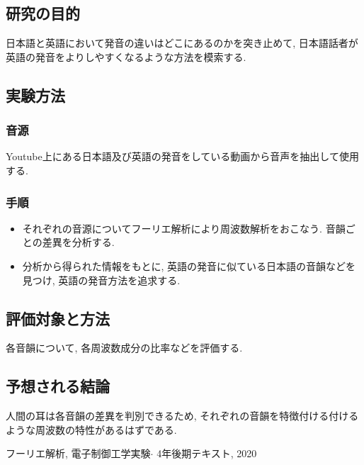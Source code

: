 \documentclass[titlepage]{jsarticle}
\begin{document}
    \subsection{研究の目的}
        日本語と英語において発音の違いはどこにあるのかを突き止めて,
        日本語話者が英語の発音をよりしやすくなるような方法を模索する.

    \subsection{実験方法}
        \subsubsection{音源}
            Youtube上にある日本語及び英語の発音をしている動画から音声を抽出して使用する.

        \subsubsection{手順}
            \begin{itemize}
                \item{
                    それぞれの音源についてフーリエ解析により周波数解析をおこなう.
                    音韻ごとの差異を分析する.
                }
                \item{
                    分析から得られた情報をもとに,
                    英語の発音に似ている日本語の音韻などを見つけ,
                    英語の発音方法を追求する.
                }
            \end{itemize}
    \subsection{評価対象と方法}
        各音韻について, 各周波数成分の比率などを評価する.

    \subsection{予想される結論}
        人間の耳は各音韻の差異を判別できるため,
        それぞれの音韻を特徴付ける付けるような周波数の特性があるはずである.
    
\begin{thebibliography}{99}
     フーリエ解析, 電子制御工学実験$\cdot$ 4年後期テキスト, 2020
\end{thebibliography}
\end{document}
